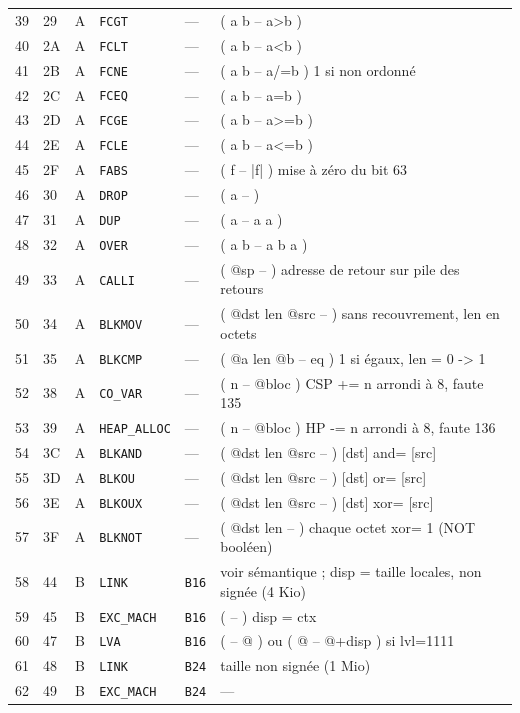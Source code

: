 \documentclass[10pt,a4paper,twoside,openany]{book}
\begin{document}
\begin{landscape}
\begin{longtable}{@{}r l c l l p{10.7cm}@{}}
39 & 29 & A & \texttt{FCGT} & --- & ( a b -- a>b )\\
40 & 2A & A & \texttt{FCLT} & --- & ( a b -- a<b )\\
41 & 2B & A & \texttt{FCNE} & --- & ( a b -- a/=b )	1 si non ordonné\\
42 & 2C & A & \texttt{FCEQ} & --- & ( a b -- a=b )\\
43 & 2D & A & \texttt{FCGE} & --- & ( a b -- a>=b )\\
44 & 2E & A & \texttt{FCLE} & --- & ( a b -- a<=b )\\
45 & 2F & A & \texttt{FABS} & --- & ( f -- |f| )		mise à zéro du bit 63\\
46 & 30 & A & \texttt{DROP} & --- & ( a -- )\\
47 & 31 & A & \texttt{DUP} & --- & ( a -- a a )\\
48 & 32 & A & \texttt{OVER} & --- & ( a b -- a b a )\\
49 & 33 & A & \texttt{CALLI} & --- & ( @sp -- )		adresse de retour sur pile des retours\\
50 & 34 & A & \texttt{BLKMOV} & --- & ( @dst len @src -- )	sans recouvrement, len en octets\\
51 & 35 & A & \texttt{BLKCMP} & --- & ( @a len @b -- eq )	1 si égaux, len = 0 -> 1\\
52 & 38 & A & \texttt{CO\_VAR} & --- & ( n -- @bloc )	CSP += n arrondi à 8, faute 135\\
53 & 39 & A & \texttt{HEAP\_ALLOC} & --- & ( n -- @bloc )	HP -= n arrondi à 8, faute 136\\
54 & 3C & A & \texttt{BLKAND} & --- & ( @dst len @src -- )	[dst] and= [src]\\
55 & 3D & A & \texttt{BLKOU} & --- & ( @dst len @src -- )	[dst] or= [src]\\
56 & 3E & A & \texttt{BLKOUX} & --- & ( @dst len @src -- )	[dst] xor= [src]\\
57 & 3F & A & \texttt{BLKNOT} & --- & ( @dst len -- )	chaque octet xor= 1 (NOT booléen)\\
58 & 44 & B & \texttt{LINK} & \texttt{B16} & voir sémantique ; disp = taille locales, non signée (4 Kio)\\
59 & 45 & B & \texttt{EXC\_MACH} & \texttt{B16} & ( -- )	disp = ctx\\
60 & 47 & B & \texttt{LVA} & \texttt{B16} & ( -- @ )  ou  ( @ -- @+disp ) si lvl=1111\\
61 & 48 & B & \texttt{LINK} & \texttt{B24} & taille non signée (1 Mio)\\
62 & 49 & B & \texttt{EXC\_MACH} & \texttt{B24} & ---\\

\end{longtable}
\end{landscape}
\end{document}
